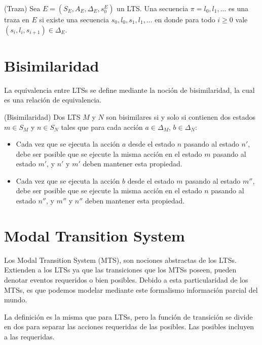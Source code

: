 \begin{definition}{(Traza)}
Sea $E = (S_{E}, A_{E}, \Delta_{E}, s_{0}^{E})$ un LTS. Una secuencia $\pi = l_{0}, l_{1}, ...$ es una traza en $E$ si existe una
secuencia $s_{0}, l_{0}, s_{1}, l_{1}, ...$ en donde para todo $i \geq 0$ vale $(s_{i}, l_{i}, s_{i + 1}) \in \Delta_{E}$.
\end{definition}

\section{Bisimilaridad}
La equivalencia entre LTSs se define mediante la noción de bisimilaridad, la cual es una relación de equivalencia.

\begin{definition}{(Bisimilaridad)}
Dos LTS $M$ y $N$ son bisimilares si y solo si contienen dos estados $m \in S_{M}$ y $n \in S_{N}$ tales que para cada
acción $a \in \Delta_{M}$, $b \in \Delta_{N}$:
\begin{itemize}

\item
Cada vez que se ejecuta la acción $a$ desde el estado $n$ pasando al estado $n'$, debe ser posible que se ejecute 
la misma acción en el estado $m$ pasando al estado $m'$, y $n'$ y $m'$ deben mantener esta propiedad.

\item
Cada vez que se ejecuta la acción $b$ desde el estado $m$ pasando al estado $m''$, debe ser posible que se ejecute 
la misma acción en el estado $n$ pasando al estado $n''$, y $m''$ y $n''$ deben mantener esta propiedad.

\end{itemize}
\end{definition}

\section{Modal Transition System}
Los Modal Transition System \cite{MTS} (MTS), son nociones abstractas de los LTSs. Extienden a los LTSs ya que las transiciones 
que los MTSs poseen, pueden denotar eventos requeridos o bien posibles. Debido a esta particularidad de los MTSs, es 
que podemos modelar mediante este formalismo información parcial del mundo.

\vspace{\baselineskip}
La definición es la misma que para LTSs, pero la función de transición se divide en dos para separar las acciones
requeridas de las posibles. Las posibles incluyen a las requeridas.

